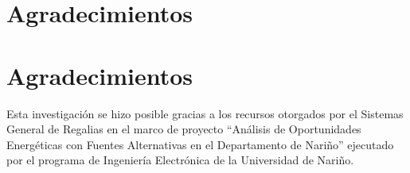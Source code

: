 \documentclass[conference]{IEEEtran}
\begin{document}
  \section*{Agradecimientos}
\else
  \section*{Agradecimientos}
\fi

Esta investigación se hizo posible gracias a los recursos otorgados por el Sistemas General de Regalias en el marco de proyecto ``Análisis de Oportunidades Energéticas con Fuentes Alternativas en el Departamento de Nariño'' ejecutado por el programa de Ingeniería Electrónica de la Universidad de Nariño.

\ifCLASSOPTIONcaptionsoff
  \newpage
\fi





\end{document}

